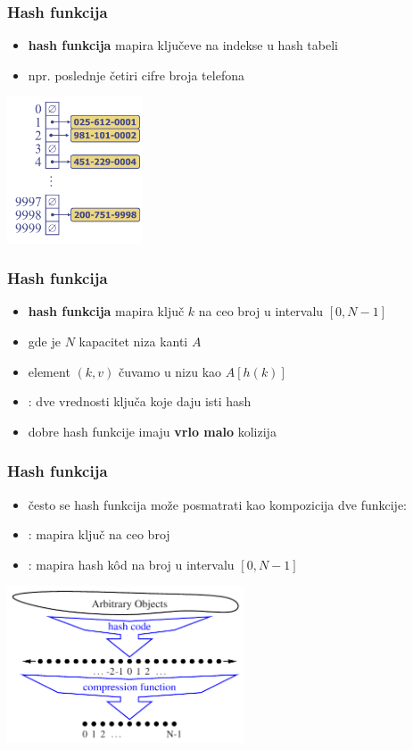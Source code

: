 \documentclass[compress]{beamer}
\begin{document}
\begin{frame}[fragile]
  \frametitle{Hash funkcija}
  \begin{itemize}
    \item \textbf{hash funkcija} mapira ključeve na indekse u hash tabeli  
    \item npr. poslednje četiri cifre broja telefona
  \end{itemize}
  \begin{center}
    \includegraphics[width=4cm]{asp-10-pic06.png}
  \end{center}
\end{frame}

\begin{frame}[fragile]
  \frametitle{Hash funkcija}
  \begin{itemize}
    \item \textbf{hash funkcija} mapira ključ $k$ na ceo broj u intervalu $[0,N-1]$
    \item gde je $N$ kapacitet niza kanti $A$
    \item element $(k,v)$ čuvamo u nizu kao $A[h(k)]$
    \item {}: dve vrednosti ključa koje daju isti hash
    \item dobre hash funkcije imaju \textbf{vrlo malo} kolizija
  \end{itemize}
\end{frame}

\begin{frame}[fragile]
  \frametitle{Hash funkcija}
  \begin{itemize}
    \item često se hash funkcija može posmatrati kao kompozicija dve funkcije:
    \item {}: mapira ključ na ceo broj
    \item {}: mapira hash kôd na broj u intervalu $[0,N-1]$ 
  \end{itemize}
  \begin{center}
    \includegraphics[width=7cm]{asp-10-pic07.pdf}
  \end{center}
\end{frame}
\end{document}
